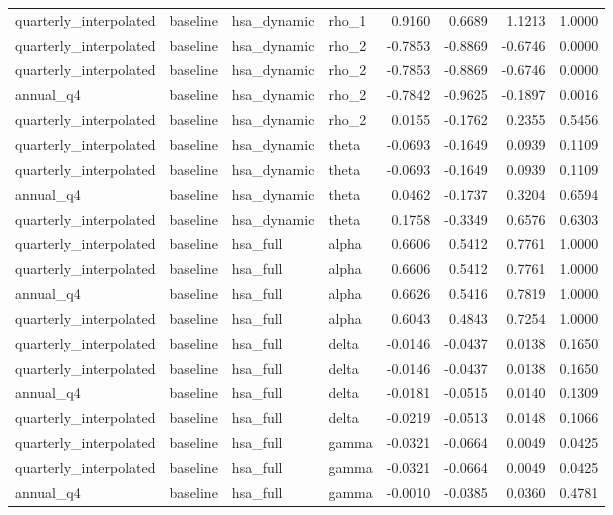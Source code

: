 \begin{tabular}{llllrrrr}
quarterly\_interpolated & baseline & hsa\_dynamic & rho\_1 & 0.9160 & 0.6689 & 1.1213 & 1.0000 \\
quarterly\_interpolated & baseline & hsa\_dynamic & rho\_2 & -0.7853 & -0.8869 & -0.6746 & 0.0000 \\
quarterly\_interpolated & baseline & hsa\_dynamic & rho\_2 & -0.7853 & -0.8869 & -0.6746 & 0.0000 \\
annual\_q4 & baseline & hsa\_dynamic & rho\_2 & -0.7842 & -0.9625 & -0.1897 & 0.0016 \\
quarterly\_interpolated & baseline & hsa\_dynamic & rho\_2 & 0.0155 & -0.1762 & 0.2355 & 0.5456 \\
quarterly\_interpolated & baseline & hsa\_dynamic & theta & -0.0693 & -0.1649 & 0.0939 & 0.1109 \\
quarterly\_interpolated & baseline & hsa\_dynamic & theta & -0.0693 & -0.1649 & 0.0939 & 0.1109 \\
annual\_q4 & baseline & hsa\_dynamic & theta & 0.0462 & -0.1737 & 0.3204 & 0.6594 \\
quarterly\_interpolated & baseline & hsa\_dynamic & theta & 0.1758 & -0.3349 & 0.6576 & 0.6303 \\
quarterly\_interpolated & baseline & hsa\_full & alpha & 0.6606 & 0.5412 & 0.7761 & 1.0000 \\
quarterly\_interpolated & baseline & hsa\_full & alpha & 0.6606 & 0.5412 & 0.7761 & 1.0000 \\
annual\_q4 & baseline & hsa\_full & alpha & 0.6626 & 0.5416 & 0.7819 & 1.0000 \\
quarterly\_interpolated & baseline & hsa\_full & alpha & 0.6043 & 0.4843 & 0.7254 & 1.0000 \\
quarterly\_interpolated & baseline & hsa\_full & delta & -0.0146 & -0.0437 & 0.0138 & 0.1650 \\
quarterly\_interpolated & baseline & hsa\_full & delta & -0.0146 & -0.0437 & 0.0138 & 0.1650 \\
annual\_q4 & baseline & hsa\_full & delta & -0.0181 & -0.0515 & 0.0140 & 0.1309 \\
quarterly\_interpolated & baseline & hsa\_full & delta & -0.0219 & -0.0513 & 0.0148 & 0.1066 \\
quarterly\_interpolated & baseline & hsa\_full & gamma & -0.0321 & -0.0664 & 0.0049 & 0.0425 \\
quarterly\_interpolated & baseline & hsa\_full & gamma & -0.0321 & -0.0664 & 0.0049 & 0.0425 \\
annual\_q4 & baseline & hsa\_full & gamma & -0.0010 & -0.0385 & 0.0360 & 0.4781 \\

\end{tabular}
